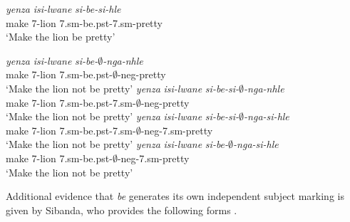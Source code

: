 \documentclass[output=paper]{langsci/langscibook}
\newcommand{\bee}[0]{\textit {be }}
\begin{document}
\begin{exe}
\ex \begin{xlist}
\ex \gll  \textit{yenza} \textit{isi-lwane} \textit{si-be-si-hle}\\
       make 7-lion 7.{\sc sm}-be.{\sc pst}-7.{\sc sm}-pretty\\
    \glt `Make the lion be pretty'

\ex \gll  \textit{yenza} \textit{isi-lwane} \textit{si-be-$\emptyset$-nga-nhle}\\
       make 7-lion 7.{\sc sm}-be.{\sc pst}-$\emptyset$-{\sc neg}-pretty\\
    \glt `Make the lion not be pretty' 
\ex \gll  \textit{yenza} \textit{isi-lwane} \textit{si-be-si-$\emptyset$-nga-nhle}\\
       make 7-lion 7.{\sc sm}-be.{\sc pst}-7.{\sc sm}-$\emptyset$-{\sc neg}-pretty\\
    \glt `Make the lion not be pretty' 
\ex \gll  \textit{yenza} \textit{isi-lwane} \textit{si-be-si-$\emptyset$-nga-si-hle}\\
       make 7-lion 7.{\sc sm}-be.{\sc pst}-7.{\sc sm}-$\emptyset$-{\sc neg}-7.{\sc sm}-pretty\\
    \glt `Make the lion not be pretty' 
\ex \gll  *\textit{yenza} \textit{isi-lwane} \textit{si-be-$\emptyset$-nga-si-hle}\\
       make 7-lion 7.{\sc sm}-be.{\sc pst}-$\emptyset$-{\sc neg}-7.{\sc sm}-pretty\\
    \glt `Make the lion not be pretty' 
\end{xlist}
\end{exe}

Additional evidence that \bee generates its own independent subject marking is given by Sibanda, who provides the following forms \citep{Sibanda2004}.

\begin{exe}
\ex {}
\end{exe}
\end{document}
